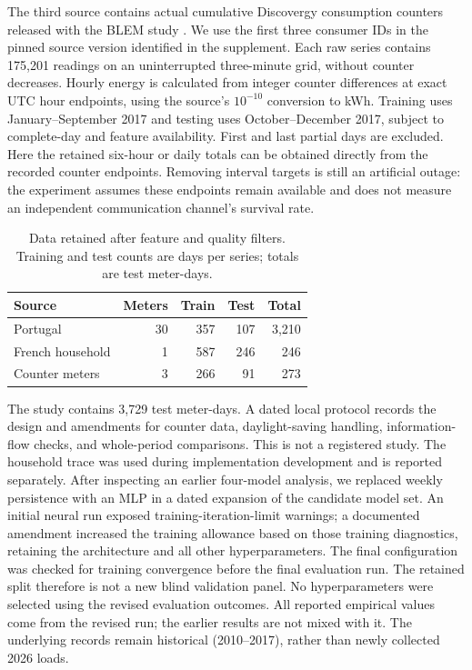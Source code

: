 \documentclass[12pt]{article}
\begin{document}
The third source contains actual cumulative Discovergy consumption counters
released with the BLEM study \cite{blem}. We use the first three consumer
IDs in the pinned source version identified in the supplement. Each raw
series contains 175,201 readings on an uninterrupted three-minute grid,
without counter decreases. Hourly energy is calculated from integer
counter differences at exact UTC hour endpoints, using the source's
$10^{-10}$ conversion to kWh. Training uses January--September 2017 and
testing uses October--December 2017, subject to complete-day and feature
availability. First and last partial days are excluded. Here the retained
six-hour or daily totals can be obtained directly from the recorded
counter endpoints. Removing interval targets is still an artificial outage:
the experiment assumes these endpoints remain available and does not
measure an independent communication channel's survival rate.

\begin{table}[t]
\centering\normalsize
\caption{Data retained after feature and quality filters. Training and
test counts are days per series; totals are test meter-days.}
\label{tab:data}
\begin{tabular}{lrrrr}
\toprule
Source & Meters & Train & Test & Total\\
\midrule
Portugal & 30 & 357 & 107 & 3,210\\
French household & 1 & 587 & 246 & 246\\
Counter meters & 3 & 266 & 91 & 273\\
\bottomrule
\end{tabular}
\end{table}

The study contains 3,729 test meter-days. A dated local protocol records
the design and amendments for counter data, daylight-saving handling,
information-flow checks, and whole-period comparisons. This is not a
registered study. The household trace was used during implementation
development and is reported separately. After inspecting an earlier
four-model analysis, we replaced weekly persistence with an MLP in a
dated expansion of the candidate model set. An initial neural run exposed training-iteration-limit
warnings; a documented amendment increased the training allowance based
on those training diagnostics, retaining the architecture and all other
hyperparameters. The final configuration was checked for training convergence
before the final evaluation run. The retained split therefore is not a new blind
validation panel. No hyperparameters were selected using the revised
evaluation outcomes. All reported empirical values come from the revised
run; the earlier results are not mixed with it. The underlying records
remain historical (2010--2017), rather than newly collected 2026 loads.
\end{document}
